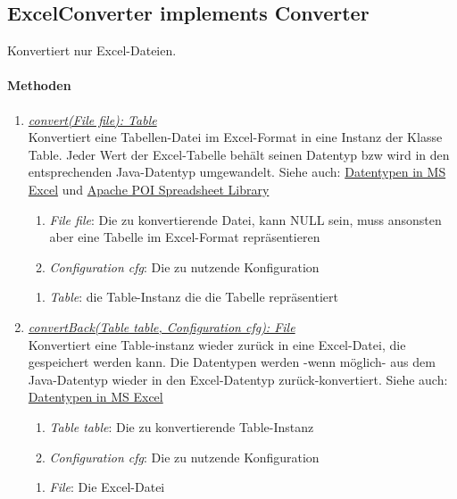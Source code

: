 \subsection{ExcelConverter implements Converter}
Konvertiert nur Excel-Dateien. \\

\paragraph{Methoden}
\begin{enumerate}[+]
	\item \underline{\textit{convert(File file): Table}} \\
	Konvertiert eine Tabellen-Datei im Excel-Format in eine Instanz der Klasse Table.
	Jeder Wert der Excel-Tabelle behält seinen Datentyp bzw wird in den entsprechenden Java-Datentyp umgewandelt.
	Siehe auch: \href{https://support.office.com/en-us/article/data-types-in-data-models-e2388f62-6122-4e2b-bcad-053e3da9ba90#__toc327893213}{Datentypen in MS Excel} und 
	\href{http://poi.apache.org/spreadsheet/}{Apache POI Spreadsheet Library}	
	\begin{enumerate}[$\bullet$]
		\item \textit{File file}: Die zu konvertierende Datei, kann NULL sein, muss ansonsten aber eine Tabelle im Excel-Format repräsentieren
		\item \textit{Configuration cfg}: Die zu nutzende Konfiguration
	\end{enumerate}
	\vspace{-0.2cm}
	\begin{enumerate}[$\circ$]
		\item \textit{Table}: die Table-Instanz die die Tabelle repräsentiert
	\end{enumerate}
	
	\item \underline{\textit{convertBack(Table table, Configuration cfg): File}} \\
	Konvertiert eine Table-instanz wieder zurück in eine Excel-Datei, die gespeichert werden kann.
	Die Datentypen werden -wenn möglich- aus dem Java-Datentyp wieder in den Excel-Datentyp zurück-konvertiert.
	Siehe auch: \href{https://support.office.com/en-us/article/data-types-in-data-models-e2388f62-6122-4e2b-bcad-053e3da9ba90#__toc327893213}{Datentypen in MS Excel}
	\begin{enumerate}[$\bullet$]
		\item \textit{Table table}: Die zu konvertierende Table-Instanz
		\item \textit{Configuration cfg}: Die zu nutzende Konfiguration
	\end{enumerate}
	\vspace{-0.2cm}
	\begin{enumerate}[$\circ$]
		\item \textit{File}: Die Excel-Datei
	\end{enumerate}
\end{enumerate}
